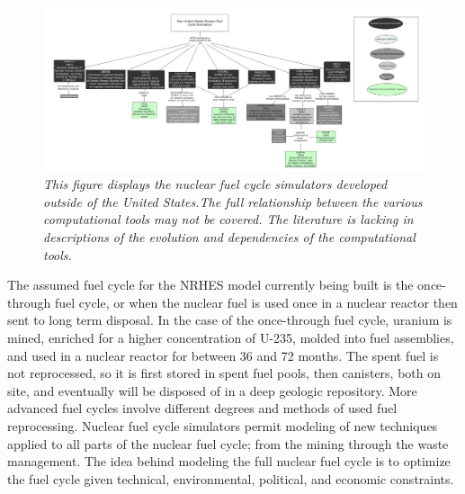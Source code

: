 \documentclass[12pt]{UIdahoMastersThesis}
\begin{document}
\begin{figure}
\includegraphics[width=\textwidth]{Non-US_FUEL_TOOLS.png}
\caption{\small \sl This figure displays the nuclear fuel cycle simulators developed outside of the United States.The full relationship between the various computational tools may not be covered.  The literature is lacking in descriptions of the evolution and dependencies of the computational tools.}
\end{figure}

The assumed fuel cycle for the NRHES model currently being built is the once-through fuel cycle, or when the nuclear fuel is used once in a nuclear reactor then sent to long term disposal. In the case of the once-through fuel cycle, uranium is mined, enriched for a higher concentration of U-235, molded into fuel assemblies, and used in a nuclear reactor for between 36 and 72 months. The spent fuel is not reprocessed, so it is first stored in spent fuel pools, then canisters, both on site, and eventually will be disposed of in a deep geologic repository. More advanced fuel cycles involve different degrees and methods of used fuel reprocessing. Nuclear fuel cycle simulators permit modeling of new techniques applied to all parts of the nuclear fuel cycle; from the mining through the waste management. The idea behind modeling the full nuclear fuel cycle is to optimize the fuel cycle given technical, environmental, political, and economic constraints.
\end{document}
